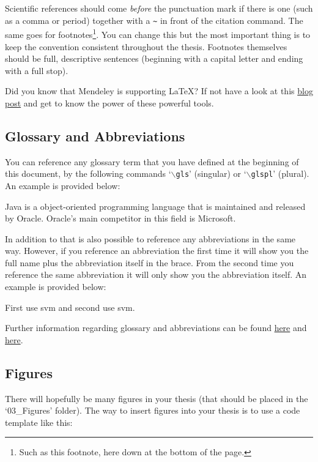 Scientific references should come \emph{before} the punctuation mark if there is one (such as a comma or period) together with a \verb!~! in front of the citation command. The same goes for footnotes\footnote{Such as this footnote, here down at the bottom of the page.}. You can change this but the most important thing is to keep the convention consistent throughout the thesis. Footnotes themselves should be full, descriptive sentences (beginning with a capital letter and ending with a full stop).

Did you know that Mendeley is supporting \LaTeX{}? If not have a look at this \href{http://blog.mendeley.com/tipstricks/howto-use-mendeley-to-create-citations-using-latex-and-bibtex/}{blog post} and get to know the power of these powerful tools.

\subsection{Glossary and Abbreviations}

You can reference any glossary term that you have defined at the beginning of this document, by the following commands `$\backslash$\texttt{gls}' (singular) or `$\backslash$\texttt{glspl}' (plural). An example is provided below:

\gls{Java} is a object-oriented programming language that is maintained and released by \gls{Oracle}. \gls{Oracle}'s main competitor in this field is \gls{Microsoft}.

In addition to that is also possible to reference any abbreviations in the same way. However, if you reference an abbreviation the first time it will show you the full name plus the abbreviation itself in the brace. From the second time you reference the same abbreviation it will only show you the abbreviation itself. An example is provided below:

First use \gls{svm} and second use \gls{svm}.

Further information regarding glossary and abbreviations can be found \href{http://www.ctan.org/pkg/glossaries}{here} and \href{http://latex-community.org/know-how/latex/55-latex-general/263-glossaries-nomenclature-lists-of-symbols-and-acronyms}{here}.

\subsection{Figures}

There will hopefully be many figures in your thesis (that should be placed in the `03\_Figures' folder). The way to insert figures into your thesis is to use a code template like this:


